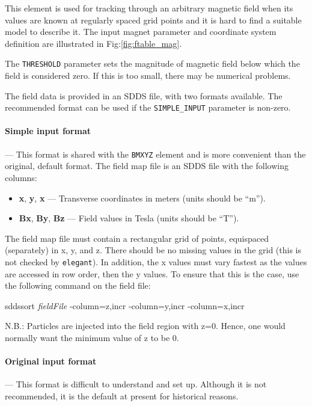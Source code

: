 This element is used for tracking through an arbitrary magnetic field
when its values are known at regularly spaced grid points and it is
hard to find a suitable model to describe it. The input magnet
parameter and coordinate system definition are illustrated in
Fig:\ref{fig:ftable_mag}. 

The \verb|THRESHOLD| parameter sets the magnitude of magnetic field below which the
field is considered zero. If this is too small, there may be numerical problems.

The field data is provided in an SDDS file, with two formats available. The recommended
format can be used if the \verb|SIMPLE_INPUT| parameter is non-zero.

\paragraph{Simple input format} --- This format is shared with the \verb|BMXYZ| element
and is more convenient than the original, default format.
The field map file is an SDDS file with the following columns:
\begin{itemize}
\item {\bf x}, {\bf y}, {\bf x} --- Transverse coordinates in meters (units should be ``m'').
\item {\bf Bx}, {\bf By}, {\bf Bz} --- Field values in Tesla (units should be ``T'').
\end{itemize}

The field map file must contain a rectangular grid of points,
equispaced (separately) in x, y, and z.  There should be no missing values
in the grid (this is not checked by {\tt elegant}).  In addition, the
x values must vary fastest as the values are accessed in row order, then the y values.
To ensure that this is the case, use the following command on the field
file:
\begin{flushleft}
sddssort {\em fieldFile} -column=z,incr -column=y,incr -column=x,incr
\end{flushleft}

N.B.: Particles are injected into the field region with z=0. Hence, one would normally want
the minimum value of z to be 0.

\paragraph{Original input format} --- This format is difficult to understand and
set up. Although it is not recommended, it is the default at present for historical
reasons.

